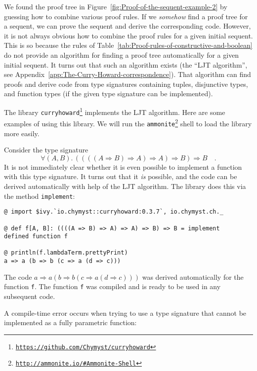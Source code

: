 We found the proof tree in Figure~\ref{fig:Proof-of-the-sequent-example-2}
by guessing how to combine various proof rules. If we \emph{somehow}
find a proof tree for a sequent, we can prove the sequent and derive
the corresponding code. However, it is not always obvious how to combine
the proof rules for a given initial sequent. This is so because the
rules of Table~\ref{tab:Proof-rules-of-constructive-and-boolean}
do not provide an algorithm for finding a proof tree automatically
for a given initial sequent. It turns out that such an algorithm exists
(the ``LJT algorithm'', see Appendix~\ref{app:The-Curry-Howard-correspondence}).
That algorithm can find proofs and derive code from type signatures
containing tuples, disjunctive types, and function types (if the given
type signature can be implemented).

The library \texttt{curryhoward}\footnote{\texttt{\href{https://github.com/Chymyst/curryhoward}{https://github.com/Chymyst/curryhoward}}}
implements the LJT algorithm. Here are some examples of using this
library. We will run the \texttt{ammonite}\footnote{\texttt{\href{http://ammonite.io/\#Ammonite-Shell}{http://ammonite.io/\#Ammonite-Shell}}}
shell to load the library more easily.

Consider the type signature 
\[
\forall(A,B).\,\left(\left(\left(\left(A\Rightarrow B\right)\Rightarrow A\right)\Rightarrow A\right)\Rightarrow B\right)\Rightarrow B\quad.
\]
It is not immediately clear whether it is even possible to implement
a function with this type signature. It turns out that it \emph{is}
possible, and the code can be derived automatically with help of the
LJT algorithm. The library does this via the method \lstinline!implement!:
\begin{lstlisting}
@ import $ivy.`io.chymyst::curryhoward:0.3.7`, io.chymyst.ch._

@ def f[A, B]: ((((A => B) => A) => A) => B) => B = implement
defined function f

@ println(f.lambdaTerm.prettyPrint)
a => a (b => b (c => a (d => c)))
\end{lstlisting}
The code $a\Rightarrow a\left(b\Rightarrow b\left(c\Rightarrow a\left(d\Rightarrow c\right)\right)\right)$
was derived automatically for the function \lstinline!f!. The function
\lstinline!f! was compiled and is ready to be used in any subsequent
code.

A compile-time error occurs when trying to use a type signature that
cannot be implemented as a fully parametric function:

